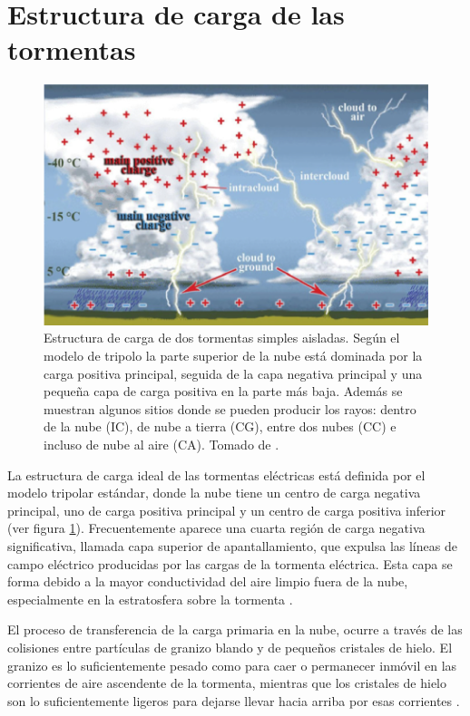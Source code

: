\documentclass[11pt,oneside,openany,letter]{book}
\begin{document}
\section{Estructura de carga de las tormentas}
\begin{figure}
    \centering
    \includegraphics[scale=0.62]{figures/tormenta_modelo.png}
    \caption[Estructura de carga según el modelo de tripolo.]{Estructura de carga de dos tormentas simples aisladas. Según el modelo de tripolo la parte superior de la nube está dominada por la carga positiva principal, seguida de la capa negativa principal y una pequeña capa de carga positiva en la parte más baja. Además se muestran algunos sitios donde se pueden producir los rayos: dentro de la nube (IC), de nube a tierra (CG), entre dos nubes (CC) e incluso de nube al aire (CA). Tomado de \cite{DwyerUman2014}.}
    \label{fig:tormenta_modelo}
\end{figure}

La estructura de carga ideal de las tormentas eléctricas está definida por el modelo tripolar estándar, donde la nube tiene un centro de carga negativa principal, uno de carga positiva principal y un centro de carga positiva inferior (ver figura \ref{fig:tormenta_modelo}). Frecuentemente aparece una cuarta región de carga negativa significativa, llamada capa superior de apantallamiento, que expulsa las líneas de campo eléctrico producidas por las cargas de la tormenta eléctrica. Esta capa se forma debido a la mayor conductividad del aire limpio fuera de la nube, especialmente en la estratosfera sobre la tormenta \cite{DwyerUman2014}. 

El proceso de transferencia de la carga primaria en la nube, ocurre a través de las colisiones entre partículas de granizo blando y de pequeños cristales de hielo. El granizo es lo suficientemente pesado como para caer o permanecer inmóvil en las corrientes de aire ascendente de la tormenta, mientras que los cristales de hielo son lo suficientemente ligeros para dejarse llevar hacia arriba por esas corrientes \cite{DwyerUman2014}. 
\end{document}
